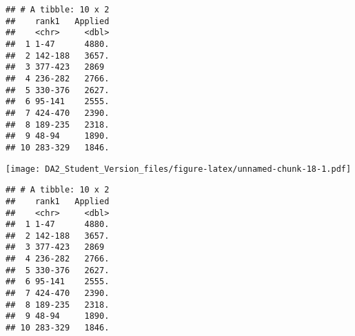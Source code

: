 \documentclass[]{article}
\newenvironment{Shaded}{\begin{snugshade}}{\end{snugshade}}
\newcommand{\KeywordTok}[1]{\textcolor[rgb]{0.13,0.29,0.53}{\textbf{#1}}}
\newcommand{\DataTypeTok}[1]{\textcolor[rgb]{0.13,0.29,0.53}{#1}}
\newcommand{\DecValTok}[1]{\textcolor[rgb]{0.00,0.00,0.81}{#1}}
\newcommand{\StringTok}[1]{\textcolor[rgb]{0.31,0.60,0.02}{#1}}
\newcommand{\OperatorTok}[1]{\textcolor[rgb]{0.81,0.36,0.00}{\textbf{#1}}}
\newcommand{\NormalTok}[1]{#1}
\begin{document}
\begin{verbatim}
## # A tibble: 10 x 2
##    rank1   Applied
##    <chr>     <dbl>
##  1 1-47      4880.
##  2 142-188   3657.
##  3 377-423   2869 
##  4 236-282   2766.
##  5 330-376   2627.
##  6 95-141    2555.
##  7 424-470   2390.
##  8 189-235   2318.
##  9 48-94     1890.
## 10 283-329   1846.
\end{verbatim}

\begin{Shaded}
\end{Shaded}

\texttt{[image: DA2\_Student\_Version\_files/figure-latex/unnamed-chunk-18-1.pdf]}

\begin{Shaded}
\end{Shaded}

\begin{verbatim}
## # A tibble: 10 x 2
##    rank1   Applied
##    <chr>     <dbl>
##  1 1-47      4880.
##  2 142-188   3657.
##  3 377-423   2869 
##  4 236-282   2766.
##  5 330-376   2627.
##  6 95-141    2555.
##  7 424-470   2390.
##  8 189-235   2318.
##  9 48-94     1890.
## 10 283-329   1846.
\end{verbatim}
\end{document}
